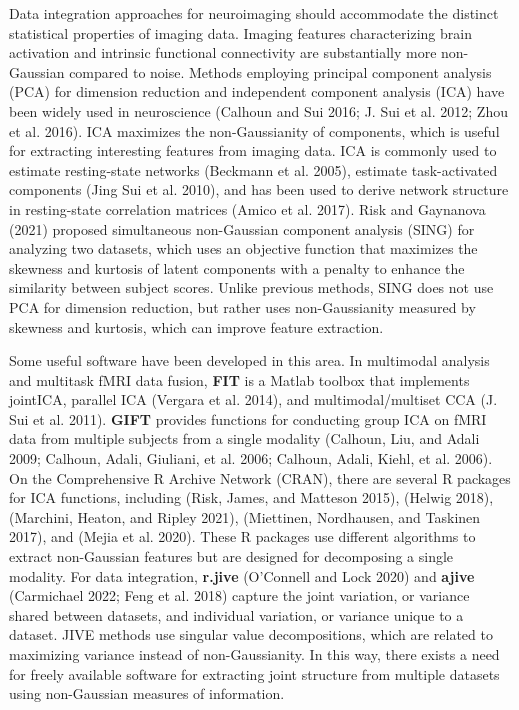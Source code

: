 Data integration approaches for neuroimaging should accommodate the distinct statistical properties of imaging data. Imaging features characterizing brain activation and intrinsic functional connectivity are substantially more non-Gaussian compared to noise. Methods employing principal component analysis (PCA) for dimension reduction and independent component analysis (ICA) have been widely used in neuroscience (Calhoun and Sui 2016; J. Sui et al. 2012; Zhou et al. 2016). ICA maximizes the non-Gaussianity of components, which is useful for extracting interesting features from imaging data. ICA is commonly used to estimate resting-state networks (Beckmann et al. 2005), estimate task-activated components (Jing Sui et al. 2010), and has been used to derive network structure in resting-state correlation matrices (Amico et al. 2017). Risk and Gaynanova (2021) proposed simultaneous non-Gaussian component analysis (SING) for analyzing two datasets, which uses an objective function that maximizes the skewness and kurtosis of latent components with a penalty to enhance the similarity between subject scores. Unlike previous methods, SING does not use PCA for dimension reduction, but rather uses non-Gaussianity measured by skewness and kurtosis, which can improve feature extraction.

Some useful software have been developed in this area. In multimodal analysis and multitask fMRI data fusion, \textbf{FIT} is a Matlab toolbox that implements jointICA, parallel ICA (Vergara et al. 2014), and multimodal/multiset CCA (J. Sui et al. 2011). \textbf{GIFT} provides functions for conducting group ICA on fMRI data from multiple subjects from a single modality (Calhoun, Liu, and Adali 2009; Calhoun, Adali, Giuliani, et al. 2006; Calhoun, Adali, Kiehl, et al. 2006). On the Comprehensive R Archive Network (CRAN), there are several R packages for ICA functions, including  (Risk, James, and Matteson 2015),  (Helwig 2018),  (Marchini, Heaton, and Ripley 2021),  (Miettinen, Nordhausen, and Taskinen 2017), and  (Mejia et al. 2020). These R packages use different algorithms to extract non-Gaussian features but are designed for decomposing a single modality. For data integration, \textbf{r.jive} (O'Connell and Lock 2020) and \textbf{ajive} (Carmichael 2022; Feng et al. 2018) capture the joint variation, or variance shared between datasets, and individual variation, or variance unique to a dataset. JIVE methods use singular value decompositions, which are related to maximizing variance instead of non-Gaussianity. In this way, there exists a need for freely available software for extracting joint structure from multiple datasets using non-Gaussian measures of information.

